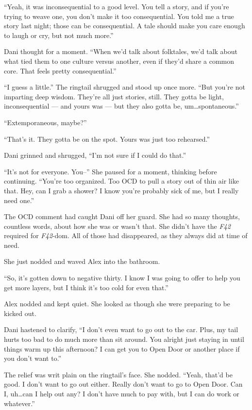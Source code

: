 ``Yeah, it was inconsequential to a good level. You tell a story, and if you're trying to weave one, you don't make it too consequential. You told me a true story last night; those can be consequential. A tale should make you care enough to laugh or cry, but not much more.''

Dani thought for a moment. ``When we'd talk about folktales, we'd talk about what tied them to one culture versus another, even if they'd share a common core. That feels pretty consequential.''

``I guess a little.'' The ringtail shrugged and stood up once more. ``But you're not imparting deep wisdom. They're all just stories, still. They gotta be light, inconsequential --- and yours was --- but they also gotta be, um\ldots{}spontaneous.''

``Extemporaneous, maybe?''

``That's it. They gotta be on the spot. Yours was just too rehearsed.''

Dani grinned and shrugged, ``I'm not sure if I could do that.''

``It's not for everyone. You--'' She paused for a moment, thinking before continuing. ``You're too organized. Too OCD to pull a story out of thin air like that. Hey, can I grab a shower? I know you're probably sick of me, but I really need one.''

The OCD comment had caught Dani off her guard. She had so many thoughts, countless words, about how she was or wasn't that. She didn't have the \emph{F42} required for \emph{F42}-dom. All of those had disappeared, as they always did at time of need.

She just nodded and waved Alex into the bathroom.

\secdiv

``So, it's gotten down to negative thirty. I know I was going to offer to help you get more layers, but I think it's too cold for even that.''

Alex nodded and kept quiet. She looked as though she were preparing to be kicked out.

Dani hastened to clarify, ``I don't even want to go out to the car. Plus, my tail hurts too bad to do much more than sit around. You alright just staying in until things warm up this afternoon? I can get you to Open Door or another place if you don't want to.''

The relief was writ plain on the ringtail's face. She nodded. ``Yeah, that'd be good. I don't want to go out either. Really don't want to go to Open Door. Can I, uh\ldots{}can I help out any? I don't have much to pay with, but I can do work or whatever.''

